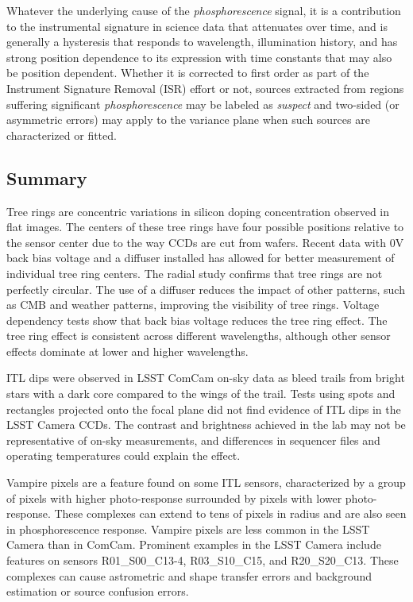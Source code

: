 Whatever the underlying cause of the {\it phosphorescence} signal, it is a contribution to the instrumental signature in science data that attenuates over time, and is generally a hysteresis that responds to wavelength, illumination history, and has strong position dependence to its expression with time constants that may also be position dependent. Whether it is corrected to first order as part of the Instrument Signature Removal (ISR) effort or not, sources extracted from regions suffering significant {\it phosphorescence} may be labeled as {\it suspect} and two-sided (or asymmetric errors) may apply to the variance plane when such sources are characterized or fitted.  

\clearpage

\subsection{Summary}
Tree rings are concentric variations in silicon doping concentration observed in flat images. The centers of these tree rings have four possible positions relative to the sensor center due to the way CCDs are cut from wafers. Recent data with 0V back bias voltage and a diffuser installed has allowed for better measurement of individual tree ring centers. The radial study confirms that tree rings are not perfectly circular. The use of a diffuser reduces the impact of other patterns, such as CMB and weather patterns, improving the visibility of tree rings. Voltage dependency tests show that back bias voltage reduces the tree ring effect. The tree ring effect is consistent across different wavelengths, although other sensor effects dominate at lower and higher wavelengths.

ITL dips were observed in LSST ComCam on-sky data as bleed trails from bright stars with a dark core compared to the wings of the trail. Tests using spots and rectangles projected onto the focal plane did not find evidence of ITL dips in the LSST Camera CCDs. The contrast and brightness achieved in the lab may not be representative of on-sky measurements, and differences in sequencer files and operating temperatures could explain the effect.

Vampire pixels are a feature found on some ITL sensors, characterized by a group of pixels with higher photo-response surrounded by pixels with lower photo-response. These complexes can extend to tens of pixels in radius and are also seen in phosphorescence response. Vampire pixels are less common in the LSST Camera than in ComCam. Prominent examples in the LSST Camera include features on sensors R01\_S00\_C13-4, R03\_S10\_C15, and R20\_S20\_C13. These complexes can cause astrometric and shape transfer errors and background estimation or source confusion errors.

